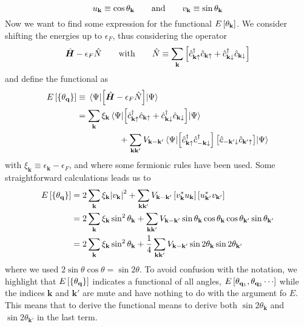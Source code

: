 \begin{equation}\label{eq:u,v normalization conditions sin cos}
	u_\mathbf{k} \equiv \cos\theta_\mathbf{k}
	\quad\qq{and}\quad
	v_\mathbf{k} \equiv \sin\theta_\mathbf{k}
\end{equation}
Now we want to find some expression for the functional $E\left[{\theta_\mathbf{k}}\right]$. We consider shifting the energies up to $\epsilon_F$, thus considering the operator
\[
	\hat{\bm H} - \epsilon_F \hat{N}
	\quad\qq{with}\quad
	\hat{N} \equiv \sum_{\mathbf{k}} \lrS{
		\hat{c}_{\mathbf{k}\uparrow}^\dagger \hat{c}_{\mathbf{k}\uparrow} + \hat{c}_{\mathbf{k}\downarrow}^\dagger \hat{c}_{\mathbf{k}\downarrow}
	}
\]
and define the functional as
\[
\begin{aligned}
	E\left[{\left\{{\theta_\mathbf{q}}\right\}}\right] &\equiv \mel{\Psi}{\left[{\hat{\bm H} - \epsilon_F \hat{N}}\right]}{\Psi} \\
	&= \sum_{\mathbf{k}} \xi_{\mathbf{k}} \mel{\Psi}{\left[{\hat{c}_{\mathbf{k}\uparrow}^\dagger \hat{c}_{\mathbf{k}\uparrow} + \hat{c}_{\mathbf{k}\downarrow}^\dagger \hat{c}_{\mathbf{k}\downarrow}}\right]}{\Psi} \\ 
	&\hspace{5em} + \sum_{\mathbf{k}\mathbf{k}'} V_{\mathbf{k}-\mathbf{k}'} \mel{\Psi}{\left[{\hat{c}_{\mathbf{k}\uparrow}^\dagger \hat{c}_{-\mathbf{k}\downarrow}^\dagger}\right] \left[{\vphantom{c^\dagger} \hat{c}_{-\mathbf{k}'\downarrow} \hat{c}_{\mathbf{k}'\uparrow}}\right]}{\Psi}
\end{aligned}
\]
with $\xi_{\mathbf{k}} \equiv \epsilon_{\mathbf{k}} - \epsilon_F$, and where some fermionic rules have been used. Some straightforward calculations leads us to
\[
\begin{aligned}
	E\left[{\left\{{\theta_\mathbf{q}}\right\}}\right] &= 2 \sum_{\mathbf{k}} \xi_{\mathbf{k}} \abs{v_\mathbf{k}}^2 + \sum_{\mathbf{k}\mathbf{k}'} V_{\mathbf{k}-\mathbf{k}'} \left[{v_\mathbf{k}^* u_\mathbf{k}}\right] \left[{u_{\mathbf{k}'}^* v_{\mathbf{k}'}}\right] \\
	&= 2 \sum_{\mathbf{k}} \xi_{\mathbf{k}} \sin^2\theta_\mathbf{k} + \sum_{\mathbf{k}\mathbf{k}'} V_{\mathbf{k}-\mathbf{k}'}
	\sin\theta_\mathbf{k} \cos\theta_\mathbf{k}
	\cos\theta_{\mathbf{k}'} \sin\theta_{\mathbf{k}'} \\
	&= 2 \sum_{\mathbf{k}} \xi_{\mathbf{k}} \sin^2\theta_\mathbf{k} + \frac{1}{4} \sum_{\mathbf{k}\mathbf{k}'} V_{\mathbf{k}-\mathbf{k}'}
	\sin2\theta_\mathbf{k} \sin2\theta_{\mathbf{k}'}
\end{aligned}
\]
where we used $2 \sin\theta\cos\theta = \sin2\theta$. To avoid confusion with the notation, we highlight that $E\left[{\left\{{\theta_\mathbf{q}}\right\}}\right]$ indicates a functional of all angles, $E\left[{\theta_{\mathbf{q}_1},\theta_{\mathbf{q}_2}\cdots}\right]$ while the indices $\mathbf{k}$ and $\mathbf{k}'$ are mute and have nothing to do with the argument fo $E$. This means that to derive the functional means to derive both $\sin2\theta_\mathbf{k}$ and $\sin2\theta_{\mathbf{k}'}$ in the last term.
